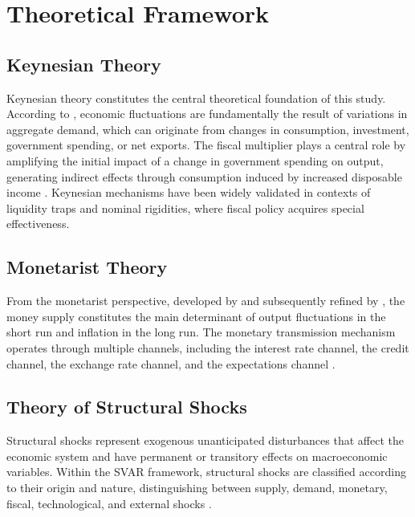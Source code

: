 \documentclass[12pt, a4paper]{article}
\begin{document}
\section{Theoretical Framework}

\subsection{Keynesian Theory}

Keynesian theory constitutes the central theoretical foundation of this study. According to \citet{keynes1936}, economic fluctuations are fundamentally the result of variations in aggregate demand, which can originate from changes in consumption, investment, government spending, or net exports. The fiscal multiplier plays a central role by amplifying the initial impact of a change in government spending on output, generating indirect effects through consumption induced by increased disposable income \citep{blanchard2017, mankiw2020, romer2019, woodford2011, eggertsson2012}. Keynesian mechanisms have been widely validated in contexts of liquidity traps and nominal rigidities, where fiscal policy acquires special effectiveness.

\subsection{Monetarist Theory}

From the monetarist perspective, developed by \citet{friedman1968} and subsequently refined by \citet{lucas1972}, the money supply constitutes the main determinant of output fluctuations in the short run and inflation in the long run. The monetary transmission mechanism operates through multiple channels, including the interest rate channel, the credit channel, the exchange rate channel, and the expectations channel \citep{mishkin1995, taylor1995, bernanke1995, svensson2010, clarida1999}.

\subsection{Theory of Structural Shocks}

Structural shocks represent exogenous unanticipated disturbances that affect the economic system and have permanent or transitory effects on macroeconomic variables. Within the SVAR framework, structural shocks are classified according to their origin and nature, distinguishing between supply, demand, monetary, fiscal, technological, and external shocks \citep{blanchardquah1989, shapirowatson1988, gali1999, cover1992, mountford2009}.
\end{document}
